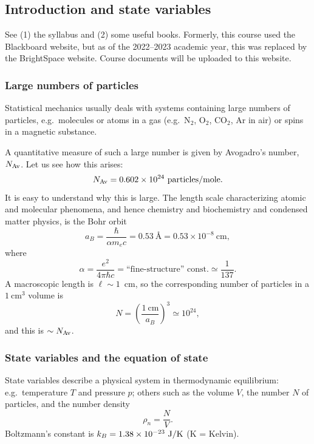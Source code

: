 \subsection{Introduction and state variables}

See (1) the syllabus and (2) some useful books. Formerly, this course used the
Blackboard website, but as of the 2022--2023 academic year, this was replaced
by the BrightSpace website. Course documents will be uploaded to this website.

\subsubsection*{Large numbers of particles}

Statistical mechanics usually deals with systems containing large numbers of
particles, e.g.\ molecules or atoms in a gas (e.g.\ N$_2$, O$_2$, CO$_2$, Ar in
air) or spins in a magnetic substance.

A quantitative measure of such a large number is given by Avogadro's number,
$N_{\mathrm{Av}}$. Let us see how this arises:
\begin{equation}
  \NAv = 0.602\times 10^{24}\ \text{particles/mole}.
\end{equation}
It is easy to understand why this is large. The length scale characterizing
atomic and molecular phenomena, and hence chemistry and biochemistry and
condensed matter physics, is the Bohr orbit
\begin{equation}
  a_B = \frac{\hbar}{\alpha m_e c} = 0.53\ \text{\AA} = 0.53\times 10^{-8}\ \text{cm},
\end{equation}
where
\begin{equation}
  \alpha = \frac{e^2}{4\pi\hbar c} = \text{``fine-structure'' const.}\simeq\frac{1}{137}.
\end{equation}
A macroscopic length is $\ell\sim 1$~cm, so the corresponding number of particles
in a $1\ \text{cm}^3$ volume is
\begin{equation}
  N = \left(\frac{1\ \text{cm}}{a_B}\right)^3 \simeq 10^{24},
\end{equation}
and this is $\sim N_{\mathrm{Av}}$.

\subsubsection*{State variables and the equation of state}

State variables describe a physical system in thermodynamic equilibrium:
e.g.\ temperature $T$ and pressure $p$; others such as the volume $V$, the number
$N$ of particles, and the number density
\begin{equation}
  \rho_n = \frac{N}{V}.
\end{equation}
Boltzmann's constant is $k_{B} = 1.38\times 10^{-23}\ \text{J/K}$ (K = Kelvin).

